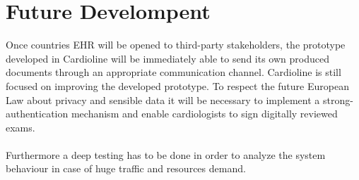 \section{Future Develompent}
Once countries EHR will be opened to third-party stakeholders, the prototype developed in Cardioline will be immediately able to send its own produced documents through an appropriate communication channel.
Cardioline is still focused on improving the developed prototype. To respect the future European Law about privacy and sensible data it will be necessary to implement a strong-authentication mechanism and enable cardiologists to sign digitally reviewed exams.\\ \\
Furthermore a deep testing has to be done in order to analyze the system behaviour in case of huge traffic and resources demand.\\